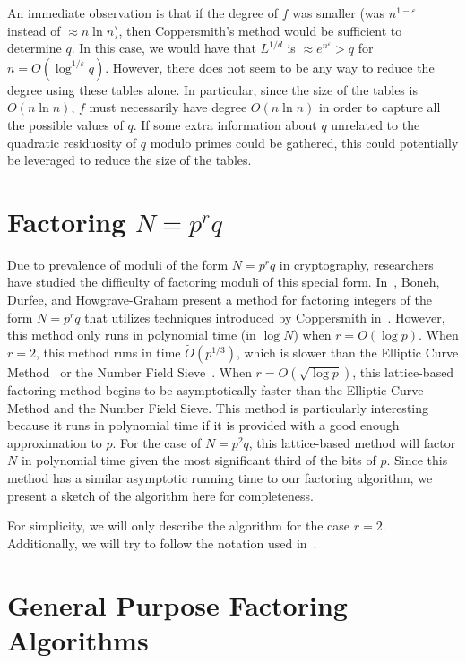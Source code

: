 \documentclass[letterpaper,twocolumn,10pt]{article}
\begin{document}
An immediate observation is that if the degree of $f$ was smaller (was $n^{1 - \varepsilon}$ instead of $\approx n \ln n$), then Coppersmith's method would be sufficient to determine $q$. In this case, we would have that $L^{1/d}$ is $\approx e^{n^{\varepsilon}} > q$ for $n = O(\log^{1/\varepsilon} q)$. However, there does not seem to be any way to reduce the degree using these tables alone. In particular, since the size of the tables is $O(n \ln n)$, $f$ must necessarily have degree $O(n \ln n)$ in order to capture all the possible values of $q$. If some extra information about $q$ unrelated to the quadratic residuosity of $q$ modulo primes could be gathered, this could potentially be leveraged to reduce the size of the tables. 

\section{Factoring $N = p^rq$}

Due to prevalence of moduli of the form $N = p^r q$ in cryptography, researchers have studied the difficulty of factoring moduli of this special form. In~\cite{dan}, Boneh, Durfee, and Howgrave-Graham present a method for factoring integers of the form $N = p^r q$ that utilizes techniques introduced by Coppersmith in~\cite{Coppersmith1997}. However, this method only runs in polynomial time (in $\log N$) when $r = O(\log p)$. When $r = 2$, this method runs in time $\tilde{O}(p^{1/3})$, which is slower than the Elliptic Curve Method~\cite{Lenstra} or the Number Field Sieve~\cite{pomerance}. When $r = O(\sqrt{\log p})$, this lattice-based factoring method begins to be asymptotically faster than the Elliptic Curve Method and the Number Field Sieve. This method is particularly interesting because it runs in polynomial time if it is provided with a good enough approximation to $p$. For the case of $N = p^2 q$, this lattice-based method will factor $N$ in polynomial time given the most significant third of the bits of $p$. Since this method has a similar asymptotic running time to our factoring algorithm, we present a sketch of the algorithm here for completeness.

For simplicity, we will only describe the algorithm for the case $r = 2$. Additionally, we will try to follow the notation used in~\cite{dan}.  

\section{General Purpose Factoring Algorithms}
\end{document}
